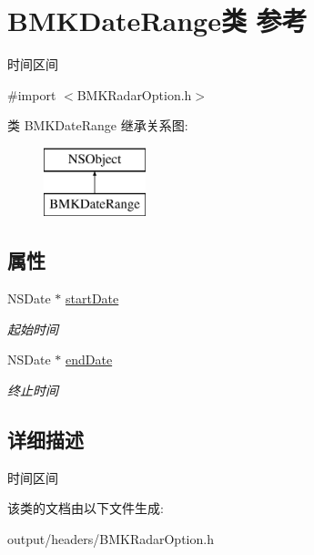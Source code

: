 \hypertarget{interface_b_m_k_date_range}{}\section{B\+M\+K\+Date\+Range类 参考}
\label{interface_b_m_k_date_range}


时间区间  




{\ttfamily \#import $<$B\+M\+K\+Radar\+Option.\+h$>$}

类 B\+M\+K\+Date\+Range 继承关系图\+:\begin{figure}[H]
\begin{center}
\leavevmode
\includegraphics[height=2.000000cm]{interface_b_m_k_date_range}
\end{center}
\end{figure}
\subsection*{属性}
\begin{DoxyCompactItemize}
\item 
\hypertarget{interface_b_m_k_date_range_ae11b407dd52e0ce78fcb2b2b6f50c8f1}{}N\+S\+Date $\ast$ \hyperlink{interface_b_m_k_date_range_ae11b407dd52e0ce78fcb2b2b6f50c8f1}{start\+Date}\label{interface_b_m_k_date_range_ae11b407dd52e0ce78fcb2b2b6f50c8f1}

\begin{DoxyCompactList}\small\item\em 起始时间 \end{DoxyCompactList}\item 
\hypertarget{interface_b_m_k_date_range_a47cad0b707202d95a96f29bb45367a07}{}N\+S\+Date $\ast$ \hyperlink{interface_b_m_k_date_range_a47cad0b707202d95a96f29bb45367a07}{end\+Date}\label{interface_b_m_k_date_range_a47cad0b707202d95a96f29bb45367a07}

\begin{DoxyCompactList}\small\item\em 终止时间 \end{DoxyCompactList}\end{DoxyCompactItemize}


\subsection{详细描述}
时间区间 

该类的文档由以下文件生成\+:\begin{DoxyCompactItemize}
\item 
output/headers/B\+M\+K\+Radar\+Option.\+h\end{DoxyCompactItemize}
